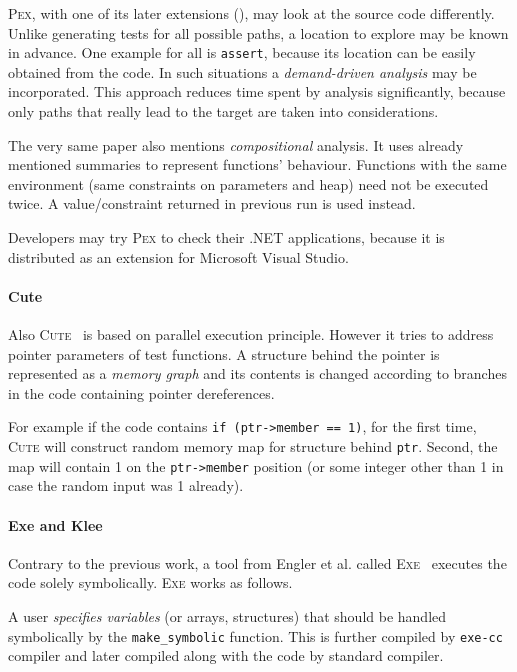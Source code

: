 \documentclass[11pt,a4paper]{article}
\begin{document}
\textsc{Pex}, with one of its later extensions (\cite{pex_ddse}), may look at
the source code differently. Unlike generating tests for all possible paths, a
location to explore may be known in advance. One example for all is
\texttt{assert}, because its location can be easily obtained from the code. In
such situations a \emph{demand-driven analysis} may be incorporated. This
approach reduces time spent by analysis significantly, because only paths
that really lead to the target are taken into considerations.

The very same paper also mentions \emph{compositional} analysis. It uses
already mentioned summaries to represent functions' behaviour. Functions with
the same environment (same constraints on parameters and heap) need not be
executed twice. A value/constraint returned in previous run is used instead.

Developers may try \textsc{Pex} to check their .NET applications, because it
is distributed as an extension for Microsoft Visual Studio.

\paragraph{Cute} Also \textsc{Cute}~\cite{cute} is based on parallel execution
principle. However it tries to address pointer parameters of test functions.
A structure behind the pointer is represented as a \emph{memory graph} and its
contents is changed according to branches in the code containing pointer
dereferences.

For example if the code contains \texttt{if (ptr->member == 1)}, for the first
time, \textsc{Cute} will construct random memory map for structure behind
\texttt{ptr}. Second, the map will contain 1 on the \texttt{ptr->member}
position (or some integer other than 1 in case the random input was 1
already).

\paragraph{Exe and Klee} Contrary to the previous work, a tool from Engler et
al. called \textsc{Exe}~\cite{exe} executes the code solely symbolically.
\textsc{Exe} works as follows.

A user \emph{specifies variables} (or arrays, structures) that should be
handled symbolically by the \texttt{make\_symbolic} function. This is further
compiled by \texttt{exe-cc} compiler and later compiled along with the code by
standard compiler.
\end{document}
